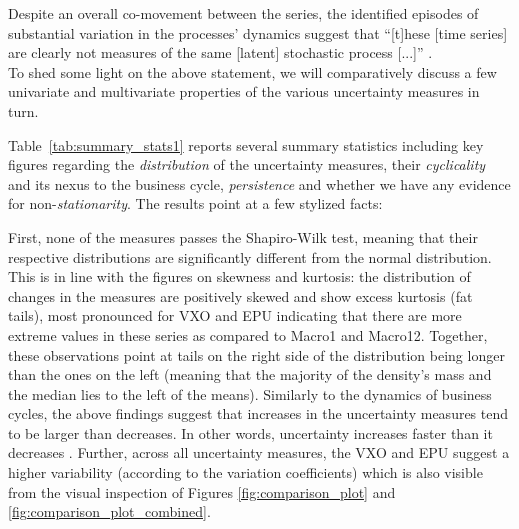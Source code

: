 \documentclass[a4paper,11pt,listof=nochaptergap,oneside,pointednumbers,bibtotoc,bigheadings,liststotoc]{scrbook}
\theoremstyle{mysatz}
\theoremstyle{mydefinition}
\theoremstyle{mytheorem}
\theoremstyle{mybemerkung}
\begin{document}
\begin{table}[t]
\centering
\caption[Correlation matrix of uncertainty measures.]{Correlation matrix of uncertainty measures. [check correlation between EPU and Macro! \citet{bakeretal:15}] report a value of 0.42 while we get 0.15!; also, after re-estimation the correlation between VXO and MACRO decreased from 0.63 to 0.53 --> check again!}
\label{tab:correlations}
\end{table}


Despite an overall co-movement between the series, the identified episodes of substantial variation in the processes' dynamics suggest that ``[t]hese [time series] are clearly not measures of the same [latent] stochastic process [...]'' \citep[p. 31]{orlikandveldkamp:14}.\\

To shed some light on the above statement, we will comparatively discuss a few univariate and multivariate properties of the various uncertainty measures in turn.

Table~\ref{tab:summary_stats1} reports several summary statistics including key figures regarding the \textit{distribution} of the uncertainty measures, their \textit{cyclicality} and its nexus to the business cycle, \textit{persistence} and whether we have any evidence for non-\textit{stationarity}. The results point at a few stylized facts:

First, none of the measures passes the Shapiro-Wilk test, meaning that their respective distributions are significantly different from the normal distribution. This is in line with the figures on skewness and kurtosis: the distribution of changes in the measures are positively skewed and show excess kurtosis (fat tails), most pronounced for VXO and EPU indicating that there are more extreme values in these series as compared to Macro1 and Macro12. Together, these observations point at tails on the right side of the distribution being longer than the ones on the left (meaning that the majority of the density's mass and the median lies to the left of the means). Similarly to the dynamics of business cycles, the above findings suggest that increases in the uncertainty measures tend to be larger than decreases. In other words, uncertainty increases faster than it decreases \citep{moore:17}. Further, across all uncertainty measures, the VXO and EPU suggest a higher variability (according to the variation coefficients) which is also visible from the visual inspection of Figures \ref{fig:comparison_plot} and \ref{fig:comparison_plot_combined}.
\end{document}
